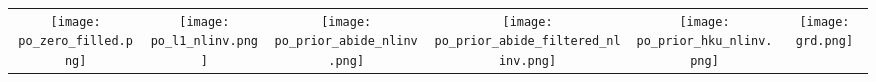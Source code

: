 
\begin{tabular}{c @{\hskip 0pt} c @{\hskip 0pt} c @{\hskip 0pt} c @{\hskip 0pt} c @{\hskip 0pt} c  }
    \texttt{[image: po\_zero\_filled.png]}&
    \texttt{[image: po\_l1\_nlinv.png]}&
    \texttt{[image: po\_prior\_abide\_nlinv.png]}&
    \texttt{[image: po\_prior\_abide\_filtered\_nlinv.png]}&
    \texttt{[image: po\_prior\_hku\_nlinv.png]}&
    \texttt{[image: grd.png]}
   \end{tabular}